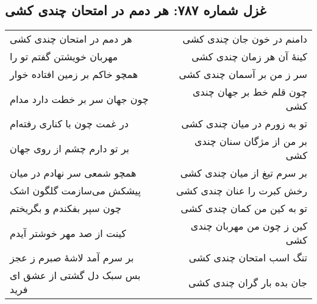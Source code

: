 \begin{center}
\section*{غزل شماره ۷۸۷: هر دمم در امتحان چندی کشی}
\label{sec:787}
\begin{longtable}{l p{0.5cm} r}
هر دمم در امتحان چندی کشی
&&
دامنم در خون جان چندی کشی
\\
مهربان خویشتن گفتم تو را
&&
کینهٔ آن هر زمان چندی کشی
\\
همچو خاکم بر زمین افتاده خوار
&&
سر ز من بر آسمان چندی کشی
\\
چون جهان سر بر خطت دارد مدام
&&
چون قلم خط بر جهان چندی کشی
\\
در غمت چون با کناری رفته‌ام
&&
تو به زورم در میان چندی کشی
\\
بر تو دارم چشم از روی جهان
&&
بر من از مژگان سنان چندی کشی
\\
همچو شمعی سر نهادم در میان
&&
بر سرم تیغ از میان چندی کشی
\\
پیشکش می‌سازمت گلگون اشک
&&
رخش کبرت را عنان چندی کشی
\\
چون سپر بفکندم و بگریختم
&&
تو به کین من کمان چندی کشی
\\
کینت از صد مهر خوشتر آیدم
&&
کین ز چون من مهربان چندی کشی
\\
بر سرم آمد لاشهٔ صبرم ز عجز
&&
تنگ اسب امتحان چندی کشی
\\
بس سبک دل گشتی از عشق ای فرید
&&
جان بده بار گران چندی کشی
\\
\end{longtable}
\end{center}

